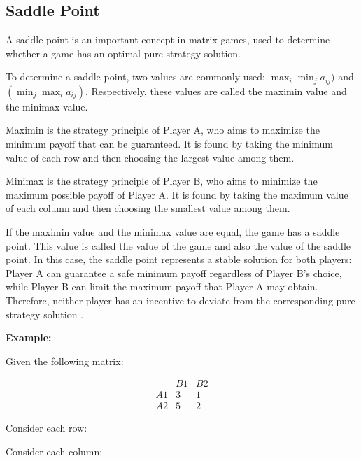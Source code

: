\documentclass[12pt,a4paper]{article}
\begin{document}
\subsection{Saddle Point}

A saddle point is an important concept in matrix games, used to determine whether a game has an optimal pure strategy solution.

To determine a saddle point, two values are commonly used: \(\max_i \min_j a_{ij})\) and \((\min_j \max_i a_{ij})\). Respectively, these values are called the maximin value and the minimax value.

Maximin is the strategy principle of Player A, who aims to maximize the minimum payoff that can be guaranteed. It is found by taking the minimum value of each row and then choosing the largest value among them.

Minimax is the strategy principle of Player B, who aims to minimize the maximum possible payoff of Player A. It is found by taking the maximum value of each column and then choosing the smallest value among them.

If the maximin value and the minimax value are equal, the game has a saddle point. This value is called the value of the game and also the value of the saddle point. In this case, the saddle point represents a stable solution for both players: Player A can guarantee a safe minimum payoff regardless of Player B's choice, while Player B can limit the maximum payoff that Player A may obtain. Therefore, neither player has an incentive to deviate from the corresponding pure strategy solution \cite{murthy2007}.


\textbf{Example:}

Given the following matrix:

\begingroup
\small
\renewcommand{\arraystretch}{0.75}
\setlength{\arraycolsep}{4pt}
\[
\begin{array}{c|cc}
 & B1 & B2\\
\hline
A1 & 3 & 1 \\
A2 & 5 & 2
\end{array}
\]
\endgroup

Consider each row: 

\noindent{}

\noindent{}


Consider each column: 

\noindent{}
\end{document}
